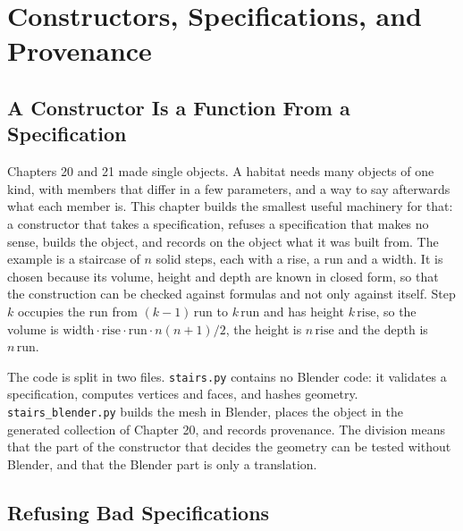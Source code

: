 \chapter{Constructors, Specifications, and Provenance}

\section{A Constructor Is a Function From a Specification}

Chapters 20 and 21 made single objects. A habitat needs many objects of one kind, with members that differ in a few parameters, and a way to say afterwards what each member is. This chapter builds the smallest useful machinery for that: a constructor that takes a specification, refuses a specification that makes no sense, builds the object, and records on the object what it was built from. The example is a staircase of $n$ solid steps, each with a rise, a run and a width. It is chosen because its volume, height and depth are known in closed form, so that the construction can be checked against formulas and not only against itself. Step $k$ occupies the run from $(k-1)\,\mathrm{run}$ to $k\,\mathrm{run}$ and has height $k\,\mathrm{rise}$, so the volume is $\mathrm{width}\cdot\mathrm{rise}\cdot\mathrm{run}\cdot n(n+1)/2$, the height is $n\,\mathrm{rise}$ and the depth is $n\,\mathrm{run}$.

The code is split in two files. \texttt{stairs.py} contains no Blender code: it validates a specification, computes vertices and faces, and hashes geometry. \texttt{stairs\_blender.py} builds the mesh in Blender, places the object in the generated collection of Chapter 20, and records provenance. The division means that the part of the constructor that decides the geometry can be tested without Blender, and that the Blender part is only a translation.



\section{Refusing Bad Specifications}

